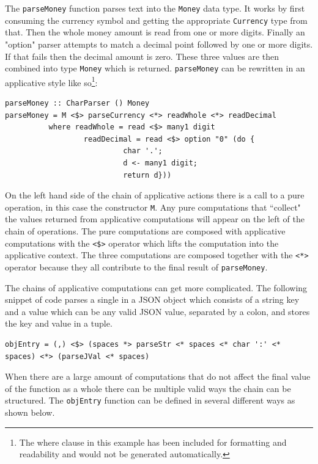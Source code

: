 The \texttt{parseMoney} function parses text into the \texttt{Money} data type. It works by first consuming the currency symbol and getting the appropriate \texttt{Currency} type from that. Then the whole money amount is read from one or more digits. Finally an "option" parser attempts to match a decimal point followed by one or more digits. If that fails then the decimal amount is zero. These three values are then combined into type \texttt{Money} which is returned. \texttt{parseMoney} can be rewritten in an applicative style like so\footnote{The where clause in this example has been included for formatting and readability and would not be generated automatically.}:

\begin{lstlisting}[frame=tlrb]
parseMoney :: CharParser () Money
parseMoney = M <$> parseCurrency <*> readWhole <*> readDecimal
          where readWhole = read <$> many1 digit
                  readDecimal = read <$> option "0" (do { 
                           char '.';
                           d <- many1 digit;
                           return d}))
\end{lstlisting}

On the left hand side of the chain of applicative actions there is a call to a pure operation, in this case the constructor \texttt{M}. Any pure computations that ``collect" the values returned from applicative computations will appear on the left of the chain of operations. The pure computations are composed with applicative computations with the \texttt{<\$>} operator which lifts the computation into the applicative context. The three computations are composed together with the \texttt{<*>} operator because they all contribute to the final result of \texttt{parseMoney}.

The chains of applicative computations can get more complicated. The following snippet of code parses a single in a JSON object which consists of a string key and a value which can be any valid JSON value, separated by a colon, and stores the key and value in a tuple. 

\begin{lstlisting}[frame=tblr]
objEntry = (,) <$> (spaces *> parseStr <* spaces <* char ':' <* spaces) <*> (parseJVal <* spaces)
\end{lstlisting}

When there are a large amount of computations that do not affect the final value of the function as a whole there can be multiple valid ways the chain can be structured. The \texttt{objEntry} function can be defined in several different ways as shown below.

